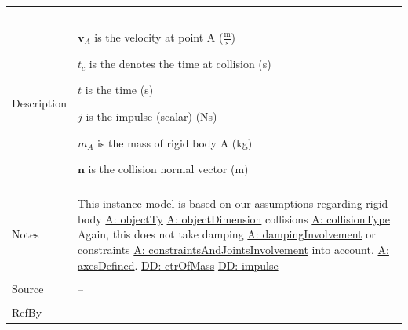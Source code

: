 \documentclass[12pt]{article}
\begin{document}
\begin{minipage}{\textwidth}
\begin{tabular}{>{\raggedright}p{}>{\raggedright\arraybackslash}p{}}
\begin{displaymath}
                     \end{displaymath}
          \\ \midrule \\
          Description & \begin{symbDescription}
                        \item{${\mathbf{v}_{A}}$ is the velocity at point A ($\frac{\text{m}}{\text{s}}$)}
                        \item{${t_{c}}$ is the denotes the time at collision (s)}
                        \item{$t$ is the time (s)}
                        \item{$j$ is the impulse (scalar) (Ns)}
                        \item{${m_{A}}$ is the mass of rigid body A (kg)}
                        \item{$\mathbf{n}$ is the collision normal vector (m)}
                        \end{symbDescription}
          \\ \midrule \\
          Notes & This instance model is based on our assumptions regarding rigid body \hyperref[assumpOT]{A: objectTy} \hyperref[assumpOD]{A: objectDimension} collisions \hyperref[assumpCT]{A: collisionType} Again, this does not take damping \hyperref[assumpDI]{A: dampingInvolvement} or constraints \hyperref[assumpCAJI]{A: constraintsAndJointsInvolvement} into account. \hyperref[assumpAD]{A: axesDefined}. \hyperref[DD:ctrOfMass]{DD: ctrOfMass} \hyperref[DD:impulse]{DD: impulse}
          \\ \midrule \\
          Source & --
          \\ \midrule \\
          RefBy & 
          \\ \bottomrule
          \end{tabular}
          \end{minipage}
\end{document}
